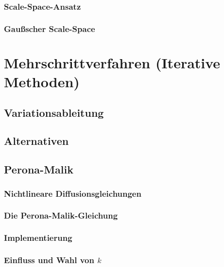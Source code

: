 \documentclass[a4paper, 11pt, accentcolor = tud3b]{tudreport}
\begin{document}
				\subsubsection{Scale-Space-Ansatz} %

				\subsubsection{Gaußscher Scale-Space} %

		\section{Mehrschrittverfahren (Iterative Methoden)} %

			\subsection{Variationsableitung} %

			\subsection{Alternativen} %

			\subsection{Perona-Malik} %

				\subsubsection{Nichtlineare Diffusionsgleichungen} %

				\subsubsection{Die Perona-Malik-Gleichung} %

				\subsubsection{Implementierung} %

				\subsubsection{Einfluss und Wahl von \(k\)} %
\end{document}
